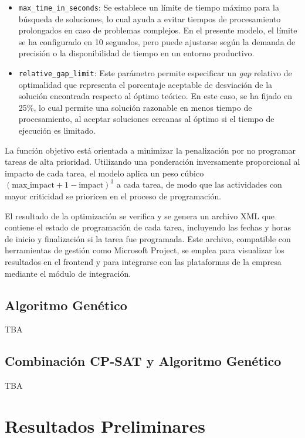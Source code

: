 \documentclass{article}
\begin{document}
\begin{itemize}
    \item \texttt{max\_time\_in\_seconds}: Se establece un límite de tiempo máximo para la búsqueda de soluciones, lo cual ayuda a evitar tiempos de procesamiento prolongados en caso de problemas complejos. En el presente modelo, el límite se ha configurado en 10 segundos, pero puede ajustarse según la demanda de precisión o la disponibilidad de tiempo en un entorno productivo.

    \item \texttt{relative\_gap\_limit}: Este parámetro permite especificar un \textit{gap} relativo de optimalidad que representa el porcentaje aceptable de desviación de la solución encontrada respecto al óptimo teórico. En este caso, se ha fijado en 25\%, lo cual permite una solución razonable en menos tiempo de procesamiento, al aceptar soluciones cercanas al óptimo si el tiempo de ejecución es limitado.
\end{itemize}

La función objetivo está orientada a minimizar la penalización por no programar tareas de alta prioridad. Utilizando una ponderación inversamente proporcional al impacto de cada tarea, el modelo aplica un peso cúbico \((\text{max\_impact} + 1 - \text{impact})^3\) a cada tarea, de modo que las actividades con mayor criticidad se prioricen en el proceso de programación.

El resultado de la optimización se verifica y se genera un archivo XML que contiene el estado de programación de cada tarea, incluyendo las fechas y horas de inicio y finalización si la tarea fue programada. Este archivo, compatible con herramientas de gestión como Microsoft Project, se emplea para visualizar los resultados en el frontend y para integrarse con las plataformas de la empresa mediante el módulo de integración.

\subsection{Algoritmo Genético}
TBA

\subsection{Combinación CP-SAT y Algoritmo Genético}
TBA

\section{Resultados Preliminares}
\end{document}
